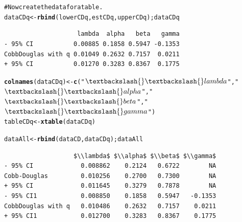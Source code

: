 \documentclass[10pt]{article}\usepackage{graphicx, color}
\makeatletter
\newcommand{\hlfunctioncall}[1]{\textcolor[rgb]{0.501960784313725,0,0.329411764705882}{\textbf{#1}}}%
\newcommand{\hlstring}[1]{\textcolor[rgb]{0.6,0.6,1}{#1}}%
\newcommand{\hlcomment}[1]{\textcolor[rgb]{0.180392156862745,0.6,0.341176470588235}{#1}}%
\newenvironment{kframe}{%
 \def\at@end@of@kframe{}%
 \ifinner\ifhmode%
  \def\at@end@of@kframe{\end{minipage}}%
  \begin{minipage}{\columnwidth}%
 \fi\fi%
 \def\FrameCommand##1{\hskip\@totalleftmargin \hskip-\fboxsep
 \colorbox{shadecolor}{##1}\hskip-\fboxsep
     \hskip-\linewidth \hskip-\@totalleftmargin \hskip\columnwidth}%
 \MakeFramed {\advance\hsize-\width
   \@totalleftmargin\z@ \linewidth\hsize
   \@setminipage}}%
 {\par\unskip\endMakeFramed%
 \at@end@of@kframe}
\newenvironment{knitrout}{}{} %
\makeatother
\begin{document}
\begin{knitrout}
\begin{kframe}
\begin{alltt}
\hlcomment{# Now create the data for a table.}
dataCDq <- \hlfunctioncall{rbind}(lowerCDq, estCDq, upperCDq); dataCDq
\end{alltt}
\begin{verbatim}
                    lambda  alpha   beta   gamma
- 95% CI           0.00885 0.1858 0.5947 -0.1353
CobbDouglas with q 0.01049 0.2632 0.7157  0.0211
+ 95% CI           0.01270 0.3283 0.8367  0.1775
\end{verbatim}
\begin{alltt}
\hlfunctioncall{colnames}(dataCDq)  <- \hlfunctioncall{c}(\hlstring{"$\textbackslash{}\textbackslash{}lambda$"}, \hlstring{"$\textbackslash{}\textbackslash{}alpha$"}, \hlstring{"$\textbackslash{}\textbackslash{}beta$"}, \hlstring{"$\textbackslash{}\textbackslash{}gamma$"})
tableCDq <- \hlfunctioncall{xtable}(dataCDq)

dataAll <- \hlfunctioncall{rbind}(dataCD, dataCDq); dataAll
\end{alltt}
\begin{verbatim}
                   $\\lambda$ $\\alpha$ $\\beta$ $\\gamma$
- 95% CI             0.008862    0.2124   0.6722        NA
Cobb-Douglas         0.010256    0.2700   0.7300        NA
+ 95% CI             0.011645    0.3279   0.7878        NA
- 95% CI1            0.008850    0.1858   0.5947   -0.1353
CobbDouglas with q   0.010486    0.2632   0.7157    0.0211
+ 95% CI1            0.012700    0.3283   0.8367    0.1775
\end{verbatim}
\end{kframe}
\end{knitrout}
\end{document}
